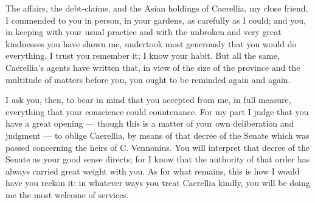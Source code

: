 

 The affairs, the debt-claims, and the Asian holdings of Caerellia, my close friend, I commended to you in person, in your gardens, as carefully as I could; and you, in keeping with your usual practice and with the unbroken and very great kindnesses you have shown me, undertook most generously that you would do everything. I trust you remember it; I know your habit. But all the same, Caerellia's agents have written that, in view of the size of the province and the multitude of matters before you, you ought to be reminded again and again.

 I ask you, then, to bear in mind that you accepted from me, in full measure, everything that your conscience could countenance. For my part I judge that you have a great opening --- though this is a matter of your own deliberation and judgment --- to oblige Caerellia, by means of that decree of the Senate which was passed concerning the heirs of C. Vennonius. You will interpret that decree of the Senate as your good sense directs; for I know that the authority of that order has always carried great weight with you. As for what remains, this is how I would have you reckon it: in whatever ways you treat Caerellia kindly, you will be doing me the most welcome of services.
